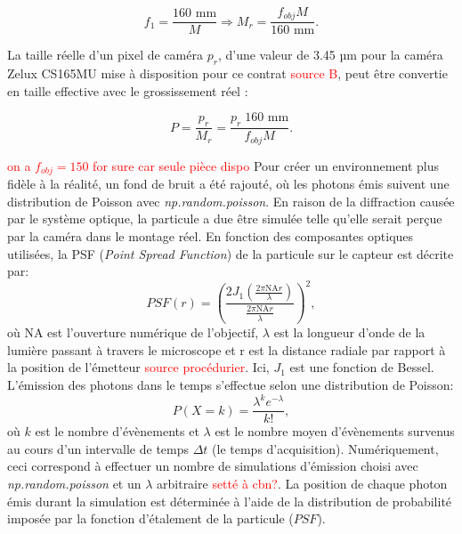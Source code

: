\documentclass[conference]{IEEEtran}
\begin{document}
\begin{equation}
  f_{1}= \frac{160 \text{ mm} }{M} \Rightarrow M_{r} = \frac{f_{obj}M}{160 \text{ mm} }.
\end{equation}

La taille réelle d'un pixel de caméra $p_r$, d'une valeur de 3.45 µm pour la caméra Zelux CS165MU
mise à disposition pour ce contrat \textcolor{red}{source B}, peut être convertie en taille effective
avec le grossissement réel :

\begin{equation}\label{pixel}
  P = \frac{p_{r}}{M_{r}} = \frac{p_{r}\;160 \text{ mm}}{f_{obj}M}.
\end{equation}

\textcolor{red}{on a $f_{obj} = 150$ for sure car seule pièce dispo} Pour créer un environnement plus fidèle à la réalité, un fond de bruit
a été rajouté, où les photons émis suivent une distribution de Poisson avec \textit{np.random.poisson}. En raison de la diffraction 
causée par le système optique, la particule a due être simulée
telle qu'elle serait perçue par la caméra dans le montage réel. En fonction des composantes optiques utilisées,
la PSF (\textit{Point Spread Function}) de la particule sur le capteur est décrite par:
\begin{equation}
  PSF(r)=\left(\frac{2J_1(\frac{2\pi \text{NA}r}{\lambda})}{\frac{2\pi \text{NA}r}{\lambda}}\right)^2,
\end{equation}
où NA est l'ouverture numérique de l'objectif, $\lambda$ est la longueur d'onde de la lumière passant à travers
le microscope et r est la distance radiale par rapport à la position de l'émetteur \textcolor{red}{source procédurier}. Ici, $J_1$
est une fonction de Bessel. L'émission des photons dans le temps s'effectue selon une distribution de Poisson:
\begin{equation}
  P(X=k)=\frac{\lambda^k e^{-\lambda}}{k!},
\end{equation}
où $k$ est le nombre d'évènements et $\lambda$ est le nombre moyen d'évènements
survenus au cours d'un intervalle de temps $\Delta t$ (le temps d'acquisition). Numériquement, ceci correspond à effectuer un nombre de simulations
d'émission choisi avec \textit{np.random.poisson} et un $\lambda$ arbitraire \textcolor{red}{setté à cbn?}. La position de chaque photon
émis durant la simulation est déterminée à l'aide de la distribution de probabilité imposée par la fonction d'étalement 
de la particule ($PSF$).
\end{document}
